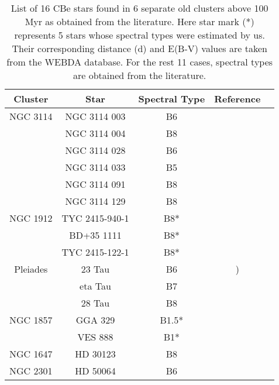 \documentclass{jaa}
\begin{document}
\begin{table*}
\centering
\caption{List of 16 CBe stars found in 6 separate old clusters above 100 Myr as obtained from the literature. Here star mark (*) represents 5 stars whose spectral types were estimated by us. Their corresponding distance (d) and E(B-V) values are taken from the WEBDA database. For the rest 11 cases, spectral types are obtained from the literature.}
\begin{minipage}{130mm}
\begin{tabular}{ccccc}
\hline 
Cluster   & Star &Spectral Type     & Reference & \\\hline
NGC 3114 & NGC 3114 003 & B6 & \cite{2018Aidelman} \\
 & NGC 3114 004 &B8 & \cite{2018Aidelman} \\
 & NGC 3114 028 &B6 &\cite{2018Aidelman} \\
 & NGC 3114 033 &B5 & \cite{2018Aidelman} \\
 & NGC 3114 091 &B8 & \cite{2018Aidelman} \\
 & NGC 3114 129 &B8 & \cite{2018Aidelman} \\ \hline 
NGC 1912 & TYC 2415-940-1 &B8* & \cite{2000H} \\
 & BD+35 1111 &B8* & \cite{2000H} \\
 & TYC 2415-122-1 &B8* & \cite{2000H} \\ \hline 
Pleiades & 23 Tau &B6 & \cite{1982Slettebak})\\
 & eta Tau &B7 & \cite{1982Slettebak}\\
 & 28 Tau &B8 & \cite{2008Taranova}\\ \hline
 
NGC 1857 & GGA 329 &B1.5* & \cite{1990Lasker}\\
 & VES 888 &B1* & \cite{1990Lasker}\\ \hline
NGC 1647 & HD 30123 &B8 & \cite{2000H}\\ \hline
NGC 2301 & HD 50064 &B6 & \cite{1942Merrill} \\ \hline
\end{tabular}
\end{minipage}
\end{table*}
\end{document}
